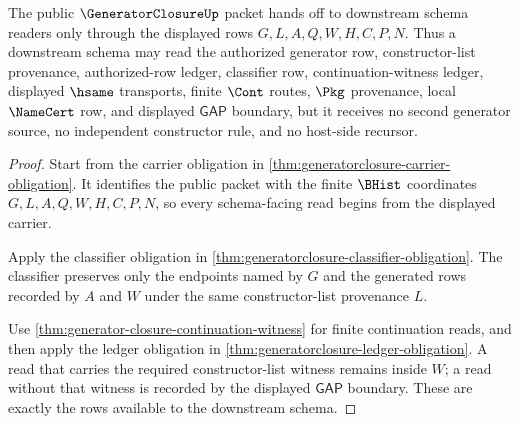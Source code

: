 \begin{theorem}
\label{thm:generatorclosure-public-bridge-schema-handoff}
The public $\GeneratorClosureUp$ packet hands off to downstream schema readers only through the displayed rows $G,L,A,Q,W,H,C,P,N$. Thus a downstream schema may read the authorized generator row, constructor-list provenance, authorized-row ledger, classifier row, continuation-witness ledger, displayed $\hsame$ transports, finite $\Cont$ routes, $\Pkg$ provenance, local $\NameCert$ row, and displayed $\mathsf{GAP}$ boundary, but it receives no second generator source, no independent constructor rule, and no host-side recursor.
\end{theorem}
\begin{proof}
Start from the carrier obligation in \autoref{thm:generatorclosure-carrier-obligation}. It identifies the public packet with the finite $\BHist$ coordinates $G,L,A,Q,W,H,C,P,N$, so every schema-facing read begins from the displayed carrier.

Apply the classifier obligation in \autoref{thm:generatorclosure-classifier-obligation}. The classifier preserves only the endpoints named by $G$ and the generated rows recorded by $A$ and $W$ under the same constructor-list provenance $L$.

Use \autoref{thm:generator-closure-continuation-witness} for finite continuation reads, and then apply the ledger obligation in \autoref{thm:generatorclosure-ledger-obligation}. A read that carries the required constructor-list witness remains inside $W$; a read without that witness is recorded by the displayed $\mathsf{GAP}$ boundary. These are exactly the rows available to the downstream schema.
\end{proof}

